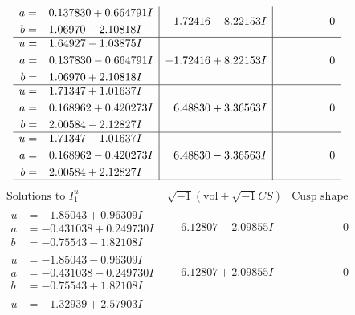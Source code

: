 \documentclass[1p]{elsarticle_modified}
\theoremstyle{definition}
\newcommand{\I}{\sqrt{-1}}
\begin{document}
$$\begin{array}{c|c|c}
\begin{aligned}
a &= \phantom{-}0.137830 + 0.664791 I \\
b &= \phantom{-}1.06970 - 2.10818 I\end{aligned}
 & -1.72416 - 8.22153 I & \phantom{-0.000000 } 0 \\ \hline\begin{aligned}
u &= \phantom{-}1.64927 - 1.03875 I \\
a &= \phantom{-}0.137830 - 0.664791 I \\
b &= \phantom{-}1.06970 + 2.10818 I\end{aligned}
 & -1.72416 + 8.22153 I & \phantom{-0.000000 } 0 \\ \hline\begin{aligned}
u &= \phantom{-}1.71347 + 1.01637 I \\
a &= \phantom{-}0.168962 + 0.420273 I \\
b &= \phantom{-}2.00584 - 2.12827 I\end{aligned}
 & \phantom{-}6.48830 + 3.36563 I & \phantom{-0.000000 } 0 \\ \hline\begin{aligned}
u &= \phantom{-}1.71347 - 1.01637 I \\
a &= \phantom{-}0.168962 - 0.420273 I \\
b &= \phantom{-}2.00584 + 2.12827 I\end{aligned}
 & \phantom{-}6.48830 - 3.36563 I & \phantom{-0.000000 } 0\\
 \hline 
 \end{array}$$\newpage$$\begin{array}{c|c|c}  
\text{Solutions to }I^u_{1}& \I (\text{vol} + \sqrt{-1}CS) & \text{Cusp shape}\\
 \hline 
\begin{aligned}
u &= -1.85043 + 0.96309 I \\
a &= -0.431038 + 0.249730 I \\
b &= -0.75543 - 1.82108 I\end{aligned}
 & \phantom{-}6.12807 - 2.09855 I & \phantom{-0.000000 } 0 \\ \hline\begin{aligned}
u &= -1.85043 - 0.96309 I \\
a &= -0.431038 - 0.249730 I \\
b &= -0.75543 + 1.82108 I\end{aligned}
 & \phantom{-}6.12807 + 2.09855 I & \phantom{-0.000000 } 0 \\ \hline\begin{aligned}
u &= -1.32939 + 2.57903 I \\

\end{aligned}
\end{array}$$
\end{document}

